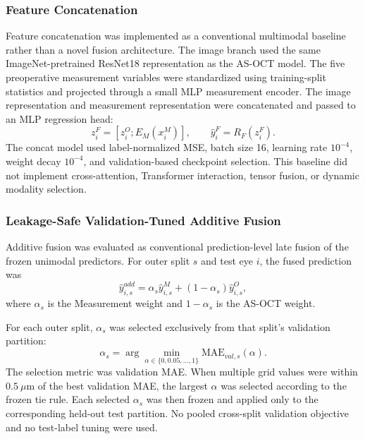 \documentclass[10pt,twocolumn]{article}
\begin{document}
\subsubsection{Feature Concatenation}

Feature concatenation was implemented as a conventional multimodal baseline rather than a novel fusion architecture. The image branch used the same ImageNet-pretrained ResNet18 representation as the AS-OCT model. The five preoperative measurement variables were standardized using training-split statistics and projected through a small MLP measurement encoder. The image representation and measurement representation were concatenated and passed to an MLP regression head:
\begin{equation}
z_i^{F}=[z_i^{O};E_M(x_i^{M})], \qquad
\hat{y}_i^{F}=R_F(z_i^{F}).
\end{equation}
The concat model used label-normalized MSE, batch size 16, learning rate $10^{-4}$, weight decay $10^{-4}$, and validation-based checkpoint selection. This baseline did not implement cross-attention, Transformer interaction, tensor fusion, or dynamic modality selection.

\subsubsection{Leakage-Safe Validation-Tuned Additive Fusion}

Additive fusion was evaluated as conventional prediction-level late fusion of the frozen unimodal predictors. For outer split $s$ and test eye $i$, the fused prediction was
\begin{equation}
\hat{y}_{i,s}^{add}
=
\alpha_s \hat{y}_{i,s}^{M}
+
(1-\alpha_s)\hat{y}_{i,s}^{O},
\end{equation}
where $\alpha_s$ is the Measurement weight and $1-\alpha_s$ is the AS-OCT weight.

For each outer split, $\alpha_s$ was selected exclusively from that split's validation partition:
\begin{equation}
\alpha_s =
\arg\min_{\alpha \in \{0,0.05,\ldots,1\}}
\mathrm{MAE}_{val,s}(\alpha).
\end{equation}
The selection metric was validation MAE. When multiple grid values were within $0.5~\mu$m of the best validation MAE, the largest $\alpha$ was selected according to the frozen tie rule. Each selected $\alpha_s$ was then frozen and applied only to the corresponding held-out test partition. No pooled cross-split validation objective and no test-label tuning were used.
\end{document}
